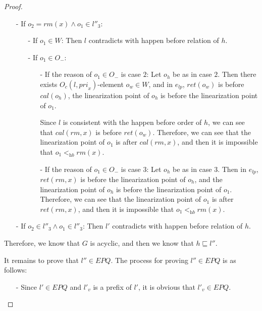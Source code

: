 \begin {proof}
\begin{itemize}
\item[-] If $o_2 = \textit{rm}(x) \wedge o_1 \in l''_3$:
    \begin{itemize}
    \setlength{\itemsep}{0.5pt}
    \item[-] If $o_1 \in W$: Then $l$ contradicts with happen before relation of $h$.

    \item[-] If $o_1 \in O_-$:
         \begin{itemize}
         \setlength{\itemsep}{0.5pt}
         \item[-] If the reason of $o_1 \in O_-$ is case $2$: Let $o_h$ be as in case $2$. Then there exists $O_c(l,\textit{pri}_x)$-element $o_w \in W$, and in $e_{\textit{lp}}$, $\textit{ret}(o_w)$ is before $\textit{cal}(o_h)$, the linearization point of $o_h$ is before the linearization point of $o_1$.

             Since $l$ is consistent with the happen before order of $h$, we can see that $\textit{cal}(\textit{rm},x)$ is before $\textit{ret}(o_w)$. Therefore, we can see that the linearization point of $o_1$ is after $\textit{cal}(\textit{rm},x)$, and then it is impossible that $o_1 <_{\textit{hb}} \textit{rm}(x)$.

         \item[-] If the reason of $o_1 \in O_-$ is case $3$: Let $o_h$ be as in case $3$. Then in $e_{\textit{lp}}$, $\textit{ret}(\textit{rm},x)$ is before the linearization point of $o_h$, and the linearization point of $o_h$ is before the linearization point of $o_1$. Therefore, we can see that the linearization point of $o_1$ is after $\textit{ret}(\textit{rm},x)$, and then it is impossible that $o_1 <_{\textit{hb}} \textit{rm}(x)$.
         \end{itemize}
    \end{itemize}

\item[-] If $o_2 \in l''_3 \wedge o_1 \in l''_3$: Then $l'$ contradicts with happen before relation of $h$.
\end{itemize}

Therefore, we know that $G$ is acyclic, and then we know that $h \sqsubseteq l''$.

It remains to prove that $l'' \in \textit{EPQ}$. The process for proving $l'' \in \textit{EPQ}$ is as follows:

\begin{itemize}
\setlength{\itemsep}{0.5pt}
\item[-] Since $l' \in \textit{EPQ}$ and $l'_v$ is a prefix of $l'$, it is obvious that $l'_v \in \textit{EPQ}$.


\end{itemize}
\end{proof}
